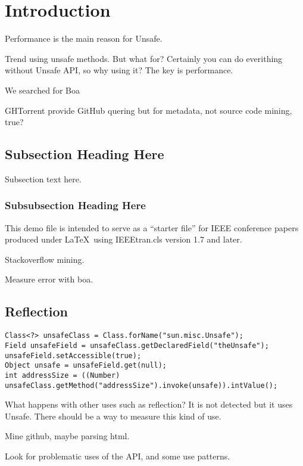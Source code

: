 
\section{Introduction} \label{sec:introduction}

Performance is the main reason for Unsafe.

Trend using unsafe methods. But what for? Certainly you can do everithing without Unsafe API, so why using it? The key is performance.

We searched for Boa \cite{Dyer-Nguyen-Rajan-Nguyen-13}


GHTorrent \cite{Gousi13} provide GitHub quering but for metadata, not source code mining, true?


\subsection{Subsection Heading Here}
Subsection text here.


\subsubsection{Subsubsection Heading Here}

%


This demo file is intended to serve as a ``starter file''
for IEEE conference papers produced under \LaTeX\ using
IEEEtran.cls version 1.7 and later.


Stackoverflow mining.

Measure error with boa.

\subsection{Reflection}

\begin{verbatim}
Class<?> unsafeClass = Class.forName("sun.misc.Unsafe");
Field unsafeField = unsafeClass.getDeclaredField("theUnsafe");
unsafeField.setAccessible(true);
Object unsafe = unsafeField.get(null);
int addressSize = ((Number) unsafeClass.getMethod("addressSize").invoke(unsafe)).intValue();
\end{verbatim}

What happens with other uses such as reflection? It is not detected but it uses Unsafe. There should be a way to measure this kind of use.

Mine github, maybe parsing html.

Look for problematic uses of the API, and some use patterns.
